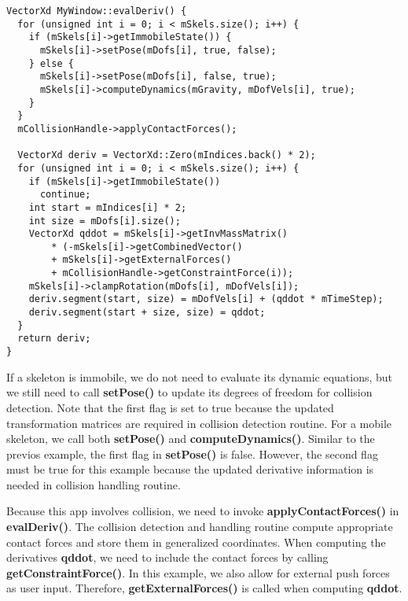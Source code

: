 \ttfamily
\begin{lstlisting}[caption=MyWindow.cpp]
VectorXd MyWindow::evalDeriv() {
  for (unsigned int i = 0; i < mSkels.size(); i++) {
    if (mSkels[i]->getImmobileState()) {
      mSkels[i]->setPose(mDofs[i], true, false);
    } else {
      mSkels[i]->setPose(mDofs[i], false, true);
      mSkels[i]->computeDynamics(mGravity, mDofVels[i], true);
    }
  }
  mCollisionHandle->applyContactForces();

  VectorXd deriv = VectorXd::Zero(mIndices.back() * 2);    
  for (unsigned int i = 0; i < mSkels.size(); i++) {
    if (mSkels[i]->getImmobileState())
      continue;
    int start = mIndices[i] * 2;
    int size = mDofs[i].size();
    VectorXd qddot = mSkels[i]->getInvMassMatrix() 
        * (-mSkels[i]->getCombinedVector() 
        + mSkels[i]->getExternalForces() 
        + mCollisionHandle->getConstraintForce(i));
    mSkels[i]->clampRotation(mDofs[i], mDofVels[i]);
    deriv.segment(start, size) = mDofVels[i] + (qddot * mTimeStep);
    deriv.segment(start + size, size) = qddot;
  }
  return deriv;
}
\end{lstlisting}
\rmfamily

If a skeleton is immobile, we do not need to evaluate
its dynamic equations, but we still need to call \textbf{setPose()} to
update its degrees of freedom for collision detection. Note that the
first flag is set to true because the updated transformation matrices
are required in collision detection routine. For a mobile skeleton, we
call both \textbf{setPose()} and \textbf{computeDynamics()}. Similar
to the previos example, the first flag in \textbf{setPose()} is
false. However, the second flag must be true for this example because
the updated derivative information is needed in collision handling
routine.

Because this app involves collision, we need to invoke
\textbf{applyContactForces()} in \textbf{evalDeriv()}. The collision
detection and handling routine compute appropriate contact forces and
store them in generalized coordinates. When computing the derivatives
\textbf{qddot}, we need to include the contact forces by calling
\textbf{getConstraintForce()}. In this example, we also allow for
external push forces as user input. Therefore,
\textbf{getExternalForces()} is called when computing \textbf{qddot}.
